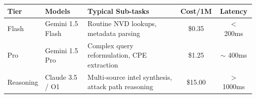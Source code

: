 \begin{tabular}{@{}llp{3cm}cc@{}}
\toprule
\textbf{Tier} & \textbf{Models} & \textbf{Typical Sub-tasks} & \textbf{Cost/1M} & \textbf{Latency} \\ \midrule
Flash & Gemini 1.5 Flash & Routine NVD lookups, metadata parsing & \$0.35 & $<$ 200ms \\
Pro & Gemini 1.5 Pro & Complex query reformulation, CPE extraction & \$1.25 & $\sim$ 400ms \\
Reasoning & Claude 3.5 / O1 & Multi-source intel synthesis, attack path reasoning & \$15.00 & $>$ 1000ms \\ \bottomrule
\end{tabular}
